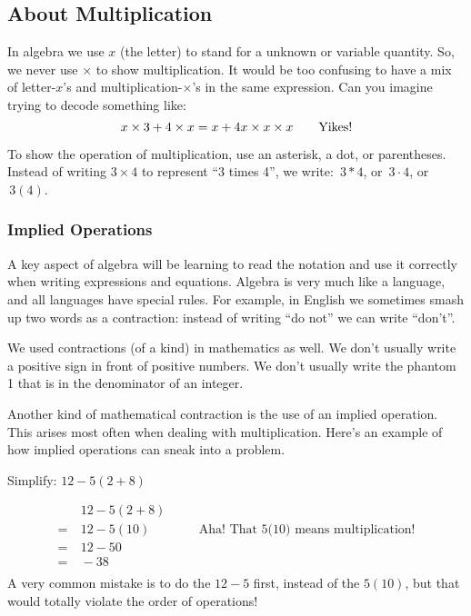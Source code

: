 \subsection{About Multiplication}

In algebra we use $x$ (the letter) to stand for a unknown or variable quantity. So, we never use $\times$ to show multiplication. It would be too confusing to have a mix of letter-$x$'s and multiplication-$\times$'s in the same expression. Can you imagine trying to decode something like: \[x \times 3 + 4 \times x = x + 4 x \times x \times x \text{\qquad Yikes!}\]

\begin{boxedwarning}
To show the operation of multiplication, use an asterisk, a dot, or parentheses. Instead of writing $3\times 4$ to represent ``3 times 4'', we write: $\,3 \ast 4$, or $\,3 \cdot 4$, or $\,3(4)$.
\end{boxedwarning}

\subsubsection{Implied Operations}

A key aspect of algebra will be learning to read the notation and use it correctly when writing expressions and equations. Algebra is very much like a language, and all languages have special rules. For example, in English we sometimes smash up two words as a contraction: instead of writing ``do not'' we can write ``don't''.

We used contractions (of a kind) in mathematics as well. We don't usually write a positive sign in front of positive numbers. We don't usually write the phantom 1 that is in the denominator of an integer.

Another kind of mathematical contraction is the use of an \gls{implied operation}. This arises most often when dealing with multiplication. Here's an example of how implied operations can sneak into a problem.

\begin{boxedex}
Simplify: $12 - 5(2 + 8)$

\exsoln{} 
\[\begin{aligned}
	&~ 12-5(2+8)\\
=	&~ 12-5(10)
&& \quad\text{Aha! That 5(10) means multiplication!}\\
=	&~ 12-50\\
=	&~ -38\\
\end{aligned}\]
A very common mistake is to do the $12-5$ first, instead of the $5(10)$, but that would totally violate the order of operations!
\end{boxedex}


